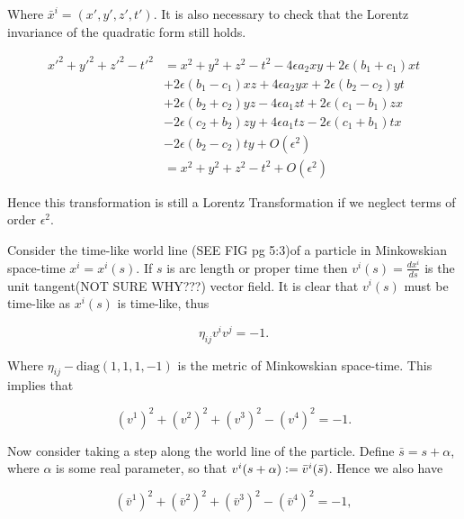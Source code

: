 \noindent Where $\bar{x}^i = (x',y',z',t')$. It is also necessary to check that the Lorentz invariance of the quadratic form still holds. 

\begin{eqnarray*}
{x'}^2 + {y'}^2 + {z'}^2 - {t'}^2 & = x^2 + y^2 + z^2 - t^2 - 4\epsilon a_2 x y + 2 \epsilon(b_1 + c_1)xt \\
                                  & + 2\epsilon (b_1 - c_1)xz + 4 \epsilon a_2 yx + 2\epsilon (b_2 - c_2)yt \\
                                  & + 2 \epsilon (b_2 + c_2)yz - 4\epsilon a_1 zt + 2 \epsilon (c_1 - b_1)zx \\
                                  & -2 \epsilon (c_2 + b_2)zy + 4 \epsilon a_1 tz - 2 \epsilon (c_1 + b_1)tx \\
                                  & -2\epsilon (b_2 - c_2) ty + O(\epsilon^2) \\
                                  & = x^2 + y^2 + z^2 - t^2 + O(\epsilon^2)
\end{eqnarray*}

\noindent Hence this transformation is still a Lorentz Transformation if we neglect terms of order $\epsilon^2$.

Consider the time-like world line (SEE FIG pg 5:3)of a particle in Minkowskian space-time $x^i = x^i(s)$. If $s$ is arc length or proper time then $v^i(s) = \frac{dx^i}{ds}$ is the unit tangent(NOT SURE WHY???) vector field. It is clear that $v^i(s)$ must be time-like as $x^i(s)$ is time-like, thus

\begin{equation*}
\eta_{ij} v^i v^j = -1. 
\end{equation*}

\noindent Where $\eta_{ij} - \text{diag}(1,1,1,-1)$ is the metric of Minkowskian space-time. This implies that 

\begin{equation*}
(v^1)^2  + (v^2)^2 + (v^3)^2  - (v^4)^2 = -1.
\end{equation*}

Now consider taking a step along the world line of the particle. Define $\bar{s} = s + \alpha$, where $\alpha$ is some real parameter, so that $v^i (s+\alpha) \vcentcolon = \bar{v}^i(\bar{s})$. Hence we also have

\begin{equation*}
({\bar{v}^1})^2  + ({\bar{v}^2})^2 + ({\bar{v}^3})^2  - ({\bar{v}^4})^2 = -1,
\end{equation*}

